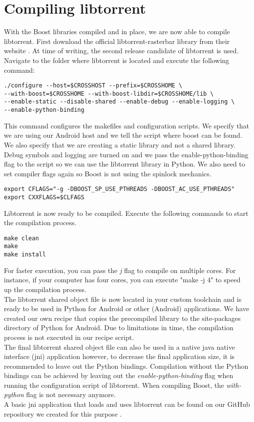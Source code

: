 \section{Compiling libtorrent}
	With the Boost libraries compiled and in place, we are now able to compile libtorrent. First download the official libtorrent-rasterbar library from their website \cite{libtorrentrasterbar}. At time of writing, the second release candidate of libtorrent is used. Navigate to the folder where libtorrent is located and execute the following command:
	\begin{lstlisting}
./configure --host=$CROSSHOST --prefix=$CROSSHOME \
--with-boost=$CROSSHOME --with-boost-libdir=$CROSSHOME/lib \
--enable-static --disable-shared --enable-debug --enable-logging \
--enable-python-binding
	\end{lstlisting}
	This command configures the makefiles and configuration scripts. We specify that we are using our Android host and we tell the script where boost can be found. We also specify that we are creating a static library and not a shared library. Debug symbols and logging are turned on and we pass the enable-python-binding flag to the script so we can use the libtorrent library in Python. We also need to set compiler flags again so Boost is not using the spinlock mechanics.
	\begin{lstlisting}
export CFLAGS="-g -DBOOST_SP_USE_PTHREADS -DBOOST_AC_USE_PTHREADS"
export CXXFLAGS=$CLFAGS
	\end{lstlisting}
	Libtorrent is now ready to be compiled. Execute the following commands to start the compilation process.
	\begin{lstlisting}
make clean
make
make install
	\end{lstlisting}
	For faster execution, you can pass the \emph{j} flag to compile on multiple cores. For instance, if your computer has four cores, you can execute "make -j 4" to speed up the compilation process.\\
	The libtorrent shared object file is now located in your custom toolchain and is ready to be used in Python for Android or other (Android) applications. We have created our own recipe that copies the precompiled library to the site-packages directory of Python for Android. Due to limitations in time, the compilation process is not executed in our recipe script.\\
	The final libtorrent shared object file can also be used in a native java native interface (jni) application however, to decrease the final application size, it is recommended to leave out the Python bindings. Compilation without the Python bindings can be achieved by leaving out the \emph{enable-python-binding} flag when running the configuration script of libtorrent. When compiling Boost, the \emph{with-python} flag is not necessary anymore.\\
	A basic jni application that loads and uses libtorrent can be found on our GitHub repository we created for this purpose \cite{hellolibtorrentgithub}.